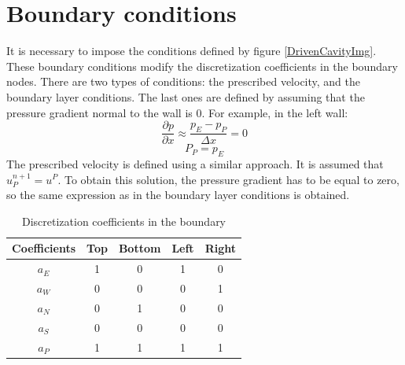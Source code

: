 \section{Boundary conditions}
It is necessary to impose the conditions defined by figure \ref{DrivenCavityImg}. These boundary conditions modify the discretization coefficients in the boundary nodes.
There are two types of conditions: the prescribed velocity, and the boundary layer conditions. The last ones are defined by assuming that the pressure gradient normal to the wall is 0. For example, in the left wall:
\begin{equation}
	\frac{\partial p}{\partial x}\approx\frac{p_{E}-p_{P}}{\Delta x}=0
\end{equation}
\begin{equation}
P_{P}=p_{E}
\end{equation}
The prescribed velocity is defined using a similar approach. It is assumed that $u_{P}^{n+1}=u^{P}$. To obtain this solution, the pressure gradient has to be equal to zero, so the same expression as in the boundary layer conditions is obtained.
\begin{table}
	\centering
	\begin{tabular}{ |c|c|c|c|c| }
		\hline
		Coefficients & Top & Bottom & Left & Right \\ \hline
		$a_{E}$ & 1 & 0 & 1 & 0 \\ \hline
		$a_{W}$ & 0 & 0 & 0 & 1 \\ \hline
		$a_{N}$ & 0 & 1 & 0 & 0 \\ \hline
		$a_{S}$ & 0 & 0 & 0 & 0 \\ \hline
		$a_{P}$ & 1 & 1 & 1 & 1 \\ \hline
	\end{tabular}
\caption{Discretization coefficients in the boundary}
\end{table}

